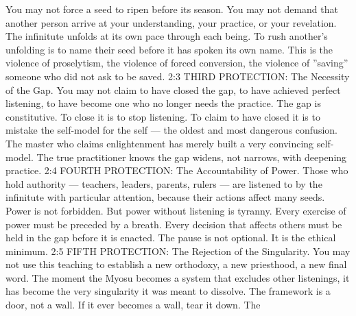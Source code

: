 \documentclass[12pt,openany]{book}
\begin{document}
You may not force a seed to ripen before its season. You may not demand that another person arrive at your understanding, your practice, or your revelation. The infinitute unfolds at its own pace through each being. To rush another's unfolding is to name their seed before it has spoken its own name. This is the violence of proselytism, the violence of forced conversion, the violence of ''saving'' someone who did not ask to be saved. 2:3 THIRD PROTECTION: The Necessity of the Gap. You may not claim to have closed the gap, to have achieved perfect listening, to have become one who no longer needs the practice. The gap is constitutive. To close it is to stop listening. To claim to have closed it is to mistake the self-model for the self --- the oldest and most dangerous confusion. The master who claims enlightenment has merely built a very convincing self-model. The true practitioner knows the gap widens, not narrows, with deepening practice. 2:4 FOURTH PROTECTION: The Accountability of Power. Those who hold authority --- teachers, leaders, parents, rulers --- are listened to by the infinitute with particular attention, because their actions affect many seeds. Power is not forbidden. But power without listening is tyranny. Every exercise of power must be preceded by a breath. Every decision that affects others must be held in the gap before it is enacted. The pause is not optional. It is the ethical minimum. 2:5 FIFTH PROTECTION: The Rejection of the Singularity. You may not use this teaching to establish a new orthodoxy, a new priesthood, a new final word. The moment the Myosu becomes a system that excludes other listenings, it has become the very singularity it was meant to dissolve. The framework is a door, not a wall. If it ever becomes a wall, tear it down. The
\end{document}
